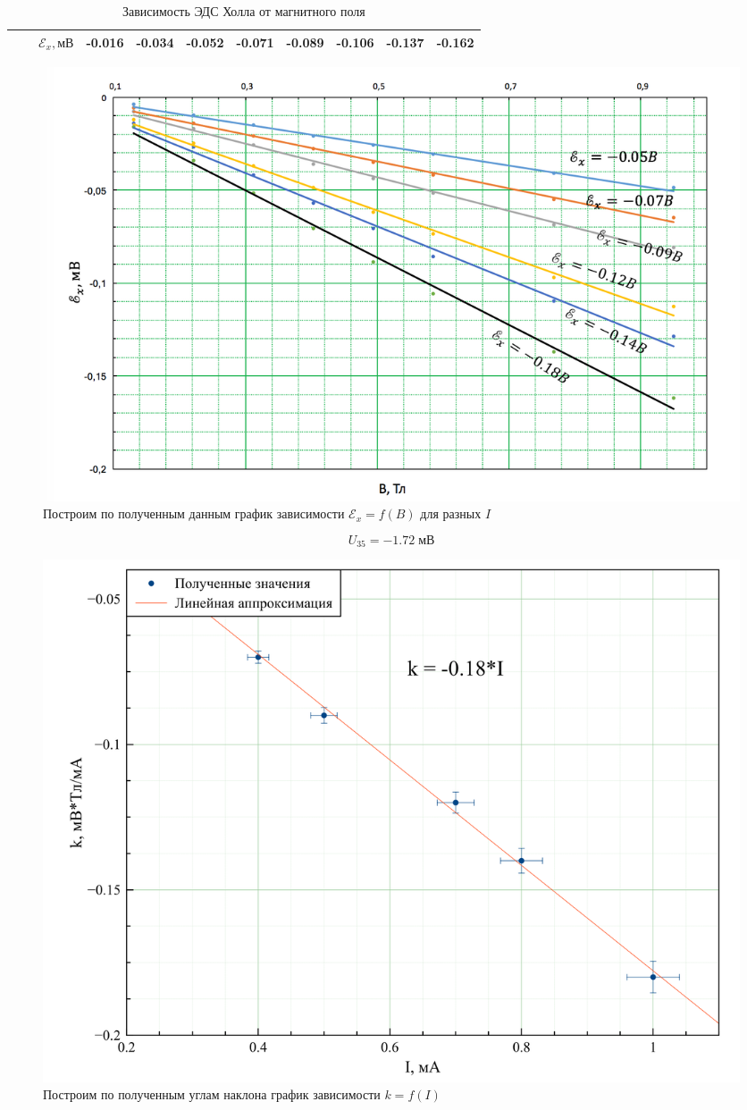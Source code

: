 \documentclass[a4paper, 12pt]{article}
\begin{document}
\begin{table}[H]
{\begin{tabular}{|c|c|c|c|c|c|c|c|c|c|c|}
                                  &                                     & $\mathscr{E}_x, \text{мВ}$                        & -0.016                        & -0.034                        & -0.052                        & -0.071                        & -0.089                        & -0.106                        & -0.137                        & -0.162                        \\ \hline
\end{tabular}
}
\caption{Зависимость ЭДС Холла от магнитного поля}
\end{table}



	\begin {figure}[H]
		\begin{center}
			\includegraphics[width = 0.9 \textwidth]{Graph}
			\caption{Построим по полученным данным график зависимости $\mathscr{E}_x = f(B)$ для разных $I$}
		\end{center}
	\end {figure}

$$U_{35} = -1.72 \;\text{мВ}$$

	\begin {figure}[H]
		\begin{center}
		\includegraphics[width = 0.8 \textwidth]{Angle}
			\caption{Построим по полученным углам наклона график зависимости $k = f(I)$}
		\end{center}
	\end {figure}
\end{document}
